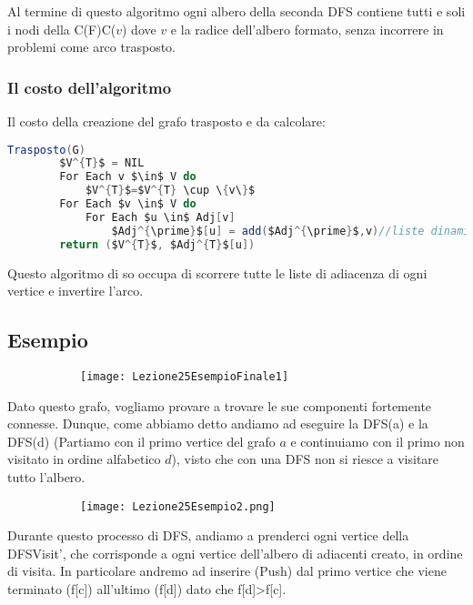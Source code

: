 Al termine di questo algoritmo ogni albero della seconda DFS contiene tutti e soli i nodi della C(F)C($v$) dove $v$ e la radice dell'albero formato, senza incorrere in problemi come arco trasposto.

\subsubsection{Il costo dell'algoritmo}

Il costo della creazione del grafo trasposto e da calcolare:
\begin{lstlisting}[language=Java]
	Trasposto(G)
		$V^{T}$ = NIL
		For Each v $\in$ V do
			$V^{T}$=$V^{T} \cup \{v\}$
		For Each $v \in$ V do
			For Each $u \in$ Adj[v]
				$Adj^{\prime}$[u] = add($Adj^{\prime}$,v)//liste dinamiche 
		return ($V^{T}$, $Adj^{T}$[u])
\end{lstlisting}

Questo algoritmo di so occupa di scorrere tutte le liste di adiacenza di ogni vertice e invertire l'arco.

\subsection{Esempio}

\begin{figure}[H]
	\centering
	\begin{subfigure}[b]{0.40\textwidth}
		\texttt{[image: Lezione25EsempioFinale1]} 
	\end{subfigure}
\end{figure}
Dato questo grafo, vogliamo provare a trovare le sue componenti fortemente connesse. Dunque, come abbiamo detto andiamo ad eseguire la DFS(a) e la DFS(d) (Partiamo con il primo vertice del grafo $a$ e continuiamo con il primo non visitato in ordine alfabetico $d$), visto  che con una DFS non si riesce a visitare tutto l'albero.

\begin{figure}[H]
	\centering
	\begin{subfigure}[b]{0.40\textwidth}
		\texttt{[image: Lezione25Esempio2.png]} 
	\end{subfigure}
\end{figure}

Durante questo processo di DFS, andiamo a prenderci ogni vertice della DFSVisit', che corrisponde a ogni vertice dell'albero di adiacenti creato, in ordine di visita. In particolare andremo ad inserire (Push) dal primo vertice che viene terminato (f[c]) all'ultimo (f[d]) dato che f[d]>f[c].


